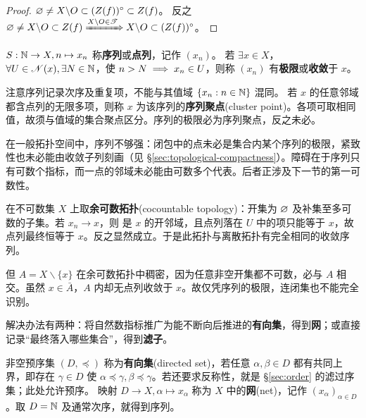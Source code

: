 \begin{proof}
    $\varnothing\ne X\backslash O\subset (Z(f))^\circ\subset Z(f)$。
    反之 $\varnothing \ne X\backslash O\subset Z(f)\xRightarrow{X\backslash O\in\mathscr T} X\backslash O\subset (Z(f))^\circ$。
\end{proof}

\begin{definition}
    $S:\mathbb{N}\to X,n\mapsto x_n$ 称\textbf{序列}或\textbf{点列}，记作 $(x_n)$。
    若 $\exists x \in X$，$\forall U\in\mathscr N(x),\exists N\in\mathbb{N}$，使 $n>N\implies x_n\in U$，则称 $(x_n)$ 有\textbf{极限}或\textbf{收敛}于 $x$。
\end{definition}

\begin{remark}
    注意序列记录次序及重复项，不能与其值域 $\{x_n:n\in\mathbb{N}\}$ 混同。
    若 $x$ 的任意邻域都含点列的无限多项，则称 $x$ 为该序列的\textbf{序列聚点}(cluster point)。各项可取相同值，故须与值域的集合聚点区分。序列的极限必为序列聚点，反之未必。
\end{remark}

在一般拓扑空间中，序列不够强：闭包中的点未必是集合内某个序列的极限，紧致性也未必能由收敛子列刻画（见 \S\ref{sec:topological-compactness}）。障碍在于序列只有可数个指标，而一点的邻域未必能由可数多个代表。后者正涉及下一节的第一可数性。

\begin{example}[余可数拓扑]\label{eg:cocountable-sequences}
    在不可数集 $X$ 上取\textbf{余可数拓扑}(cocountable topology)：开集为 $\varnothing$ 及补集至多可数的子集。若 $x_n\to x$，则
    是 $x$ 的开邻域，且点列落在 $U$ 中的项只能等于 $x$，故点列最终恒等于 $x$。反之显然成立。于是此拓扑与离散拓扑有完全相同的收敛序列。

    但 $A=X\backslash\{x\}$ 在余可数拓扑中稠密，因为任意非空开集都不可数，必与 $A$ 相交。虽然 $x\in\bar A$，$A$ 内却无点列收敛于 $x$。故仅凭序列的极限，连闭集也不能完全识别。
\end{example}

解决办法有两种：将自然数指标推广为能不断向后推进的\textbf{有向集}，得到\textbf{网}；或直接记录“最终落入哪些集合”，得到\textbf{滤子}。

\begin{definition}
    非空预序集 $(D,\preceq)$ 称为\textbf{有向集}(directed set)，若任意 $\alpha,\beta\in D$ 都有共同上界，即存在 $\gamma\in D$ 使 $\alpha\preceq\gamma,\beta\preceq\gamma$。若还要求反称性，就是 \S\ref{sec:order} 的滤过序集；此处允许预序。
    映射 $D\to X,\alpha\mapsto x_\alpha$ 称为 $X$ 中的\textbf{网}(net)，记作 $(x_\alpha)_{\alpha\in D}$。取 $D=\mathbb{N}$ 及通常次序，就得到序列。
\end{definition}

